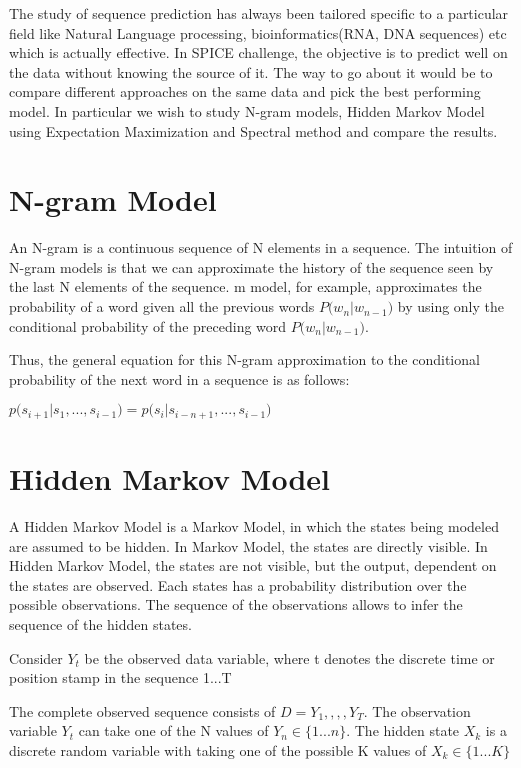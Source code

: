 \documentclass{article} %
\begin{document}
The study of sequence prediction has always been tailored specific to a particular field like Natural Language processing, bioinformatics(RNA, DNA sequences) etc which is actually effective. In SPICE challenge, the objective is to predict well on the data without knowing the source of it. The way to go about it would be to compare different approaches on the same data and pick the best performing model. In particular we wish to study N-gram models, Hidden Markov Model using Expectation Maximization and Spectral method and compare the results.

\section{N-gram Model}
\label{N-Gram Model}
An N-gram is a continuous sequence of N elements in a sequence. The intuition of N-gram models is that we can approximate the history of the sequence seen by the last N elements of the sequence. m model, for example, approximates the probability of a word given all the previous words $P\big(w_n|w_{n−1}\big)$ by using only the conditional probability of the preceding word $P\big(w_n|w_{n−1}\big)$.

Thus, the general equation for this N-gram approximation to the conditional probability of the next word in a sequence is as follows:

$p\big(s_{i+1}|s_1, . . . , s_{i−1}\big) = p\big(s_i|s_{i-n+1}, . . . , s_{i-1}\big)$
\section{Hidden Markov Model}
\label{HMM}

A Hidden Markov Model is a Markov Model, in which the states being modeled are assumed to be hidden. In Markov Model, the states are directly visible. In Hidden Markov Model, the states are not visible, but the output, dependent on the states are observed. Each states has a probability distribution over the possible observations. The sequence of the observations allows to infer the sequence of the hidden states. 

Consider \(Y_t\) be the observed data variable, where t denotes the discrete time or position stamp in the sequence 1...T

The complete observed sequence consists of \(D ={Y_1,,,,Y_T}\). The observation variable $Y_t$ can take one of the N values of \(Y_n \in \{1...n\}\). The hidden state \(X_k\) is a discrete random variable with taking one of the possible K values of \(X_k \in \{1...K\}\)
\end{document}
